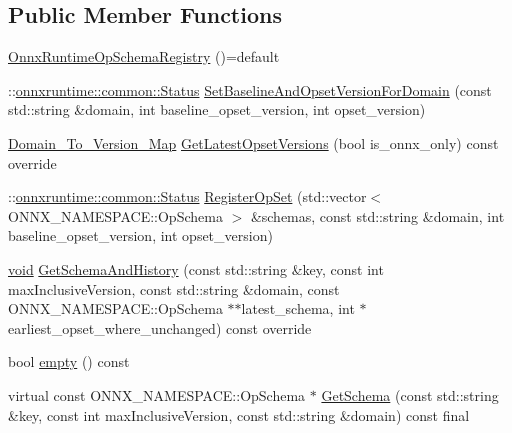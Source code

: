 \subsection*{Public Member Functions}
\begin{DoxyCompactItemize}
\item 
\mbox{\hyperlink{classonnxruntime_1_1OnnxRuntimeOpSchemaRegistry_af8878d9ff2b458f47b951b9f282a60ed}{Onnx\+Runtime\+Op\+Schema\+Registry}} ()=default
\item 
\+::\mbox{\hyperlink{classonnxruntime_1_1common_1_1Status}{onnxruntime\+::common\+::\+Status}} \mbox{\hyperlink{classonnxruntime_1_1OnnxRuntimeOpSchemaRegistry_a5a342a48e87028bfec6a725893f646d1}{Set\+Baseline\+And\+Opset\+Version\+For\+Domain}} (const std\+::string \&domain, int baseline\+\_\+opset\+\_\+version, int opset\+\_\+version)
\item 
\mbox{\hyperlink{namespaceonnxruntime_ab773a024322804641f5eb4964e3471d6}{Domain\+\_\+\+To\+\_\+\+Version\+\_\+\+Map}} \mbox{\hyperlink{classonnxruntime_1_1OnnxRuntimeOpSchemaRegistry_a862d1ac6dbd221ab94d6db030f6f1c52}{Get\+Latest\+Opset\+Versions}} (bool is\+\_\+onnx\+\_\+only) const override
\item 
\+::\mbox{\hyperlink{classonnxruntime_1_1common_1_1Status}{onnxruntime\+::common\+::\+Status}} \mbox{\hyperlink{classonnxruntime_1_1OnnxRuntimeOpSchemaRegistry_a3cb49cfee4132df744ee563d39b00a37}{Register\+Op\+Set}} (std\+::vector$<$ O\+N\+N\+X\+\_\+\+N\+A\+M\+E\+S\+P\+A\+C\+E\+::\+Op\+Schema $>$ \&schemas, const std\+::string \&domain, int baseline\+\_\+opset\+\_\+version, int opset\+\_\+version)
\item 
\mbox{\hyperlink{mlasi_8h_a88f941d423cb2a819b70a1358982b1a6}{void}} \mbox{\hyperlink{classonnxruntime_1_1OnnxRuntimeOpSchemaRegistry_ab12d5511c6c08e2e38a15513ad921a57}{Get\+Schema\+And\+History}} (const std\+::string \&key, const int max\+Inclusive\+Version, const std\+::string \&domain, const O\+N\+N\+X\+\_\+\+N\+A\+M\+E\+S\+P\+A\+C\+E\+::\+Op\+Schema $\ast$$\ast$latest\+\_\+schema, int $\ast$earliest\+\_\+opset\+\_\+where\+\_\+unchanged) const override
\item 
bool \mbox{\hyperlink{classonnxruntime_1_1OnnxRuntimeOpSchemaRegistry_a476b3325cda37a9d99428ffb18406822}{empty}} () const
\item 
virtual const O\+N\+N\+X\+\_\+\+N\+A\+M\+E\+S\+P\+A\+C\+E\+::\+Op\+Schema $\ast$ \mbox{\hyperlink{classonnxruntime_1_1OnnxRuntimeOpSchemaRegistry_aebb95e90aa451584b39a50d07f87839f}{Get\+Schema}} (const std\+::string \&key, const int max\+Inclusive\+Version, const std\+::string \&domain) const final
\end{DoxyCompactItemize}


